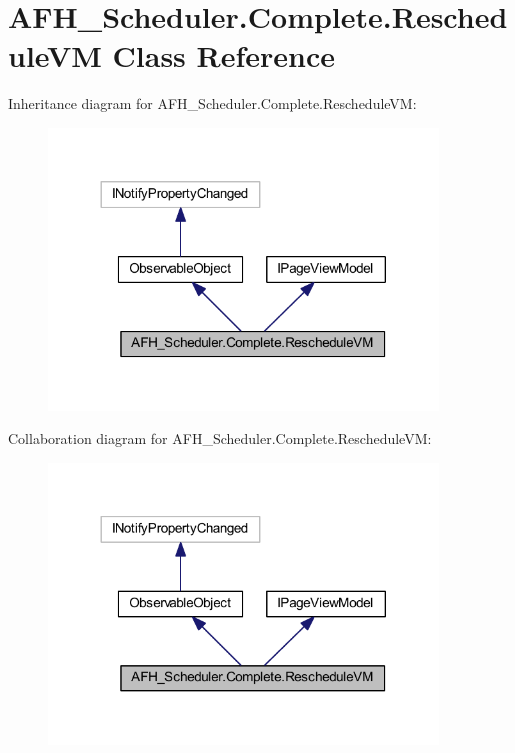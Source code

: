 \section{A\+F\+H\+\_\+\+Scheduler.\+Complete.\+Reschedule\+VM Class Reference}
\label{class_a_f_h___scheduler_1_1_complete_1_1_reschedule_v_m}


Inheritance diagram for A\+F\+H\+\_\+\+Scheduler.\+Complete.\+Reschedule\+VM\+:
\nopagebreak
\begin{figure}[H]
\begin{center}
\leavevmode
\includegraphics[width=293pt]{class_a_f_h___scheduler_1_1_complete_1_1_reschedule_v_m__inherit__graph}
\end{center}
\end{figure}


Collaboration diagram for A\+F\+H\+\_\+\+Scheduler.\+Complete.\+Reschedule\+VM\+:
\nopagebreak
\begin{figure}[H]
\begin{center}
\leavevmode
\includegraphics[width=293pt]{class_a_f_h___scheduler_1_1_complete_1_1_reschedule_v_m__coll__graph}
\end{center}
\end{figure}
